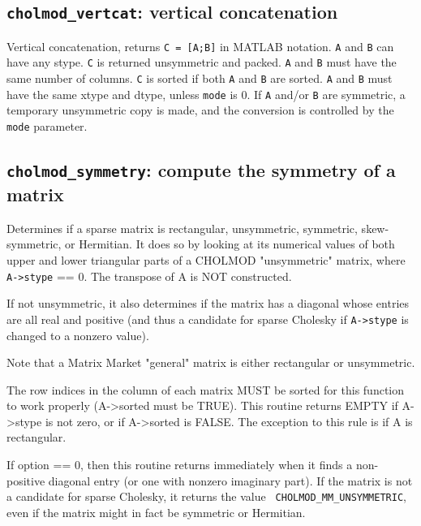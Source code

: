\documentclass[11pt]{article}
\begin{document}
\subsection{{\tt cholmod\_vertcat}: vertical concatenation}


Vertical concatenation, returns {\tt C = [A;B]} in MATLAB notation.  {\tt A}
and {\tt B} can have any stype.  {\tt C} is returned unsymmetric and packed.
{\tt A} and {\tt B} must have the same number of columns.  {\tt C} is sorted if
both {\tt A} and {\tt B} are sorted.  {\tt A} and {\tt B} must have the same
xtype and dtype, unless {\tt mode} is 0.
%
If \verb'A' and/or \verb'B' are symmetric, a temporary unsymmetric copy is
made, and the conversion is controlled by the \verb'mode' parameter.

\subsection{{\tt cholmod\_symmetry}: compute the symmetry of a matrix}


Determines if a sparse matrix is rectangular, unsymmetric, symmetric,
skew-symmetric, or Hermitian.  It does so by looking at its numerical values
of both upper and lower triangular parts of a CHOLMOD "unsymmetric"
matrix, where \verb'A->stype' == 0.  The transpose of A is NOT constructed.

If not unsymmetric, it also determines if the matrix has a diagonal whose
entries are all real and positive (and thus a candidate for sparse Cholesky
if \verb'A->stype' is changed to a nonzero value).

Note that a Matrix Market "general" matrix is either rectangular or
unsymmetric.

The row indices in the column of each matrix MUST be sorted for this function
to work properly (A->sorted must be TRUE).  This routine returns EMPTY if
A->stype is not zero, or if A->sorted is FALSE.  The exception to this rule
is if A is rectangular.

If option == 0, then this routine returns immediately when it finds a
non-positive diagonal entry (or one with nonzero imaginary part).   If the
matrix is not a candidate for sparse Cholesky, it returns the value {\tt
CHOLMOD\_MM\_UNSYMMETRIC}, even if the matrix might in fact be symmetric or
Hermitian.
\end{document}
